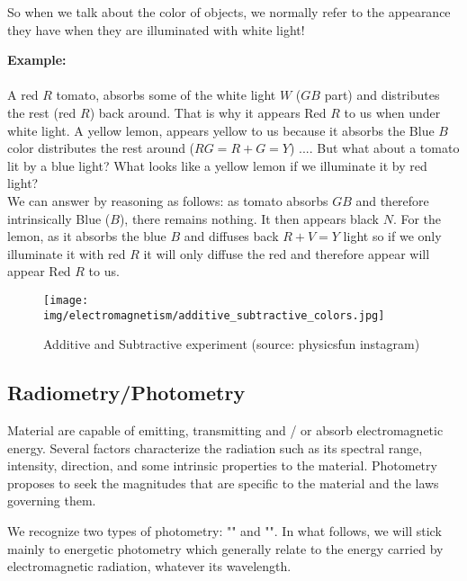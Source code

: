 	So when we talk about the color of objects, we normally refer to the appearance they have when they are illuminated with white light!
	\begin{tcolorbox}[colframe=black,colback=white,sharp corners]
	\textbf{{\Large {}}Example:}\\\\
	A red $R$ tomato, absorbs some of the white light $W$ ($GB$ part) and distributes the rest (red $R$) back around. That is why it appears Red $R$ to us when under white light. A yellow lemon, appears yellow to us because it absorbs the Blue $B$ color distributes the rest around ($RG=R+G=Y$) .... But what about a tomato lit by a blue light? What looks like a yellow lemon if we illuminate it by red light?\\
	
	We can answer by reasoning as follows: as tomato absorbs $GB$ and therefore intrinsically Blue ($B$), there remains nothing. It then appears black $N$. For the lemon, as it absorbs the blue $B$ and diffuses back $R + V=Y$ light so if we only illuminate it with red $R$ it will only diffuse the red and therefore appear will appear Red $R$ to us.
	\end{tcolorbox}
	\begin{figure}[H]
		\centering
		\texttt{[image: img/electromagnetism/additive\_subtractive\_colors.jpg]}
		\caption[Additive and Subtractive experiment]{Additive and Subtractive experiment (source: physicsfun instagram)}
	\end{figure}
	
	\pagebreak
	\subsection{Radiometry/Photometry}
	Material are capable of emitting, transmitting and / or absorb electromagnetic energy. Several factors characterize the radiation such as its spectral range, intensity, direction, and some intrinsic properties to the material. Photometry proposes to seek the magnitudes that are specific to the material and the laws governing them.
	
	We recognize two types of photometry: "" and "". In what follows, we will stick mainly to energetic photometry which generally relate to the energy carried by electromagnetic radiation, whatever its wavelength.
	
